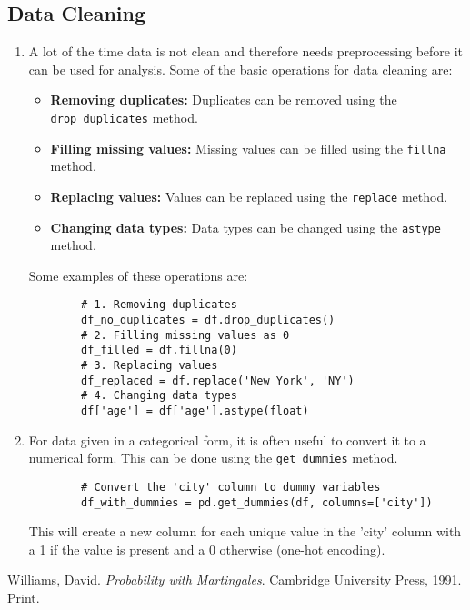 \documentclass[letterpaper, 11pt]{article}
\newcommand{\1}{\mathds{1}}	%
\theoremstyle{definition}
\begin{document}
\subsection{Data Cleaning}
\begin{enumerate}
    \item A lot of the time data is not clean and therefore needs preprocessing before it can be used for analysis. Some of the basic 
    operations for data cleaning are:
    \begin{itemize}
        \item \textbf{Removing duplicates:} Duplicates can be removed using the \texttt{drop\_duplicates} method.
        \item \textbf{Filling missing values:} Missing values can be filled using the \texttt{fillna} method.
        \item \textbf{Replacing values:} Values can be replaced using the \texttt{replace} method.
        \item \textbf{Changing data types:} Data types can be changed using the \texttt{astype} method.
    \end{itemize}
    Some examples of these operations are:
    \begin{verbatim}
        # 1. Removing duplicates
        df_no_duplicates = df.drop_duplicates()
        # 2. Filling missing values as 0
        df_filled = df.fillna(0)
        # 3. Replacing values
        df_replaced = df.replace('New York', 'NY')
        # 4. Changing data types
        df['age'] = df['age'].astype(float)
    \end{verbatim}
    \item For data given in a categorical form, it is often useful to convert it to a numerical form. This can be done using the \texttt{get\_dummies} method.
    \begin{verbatim}
        # Convert the 'city' column to dummy variables
        df_with_dummies = pd.get_dummies(df, columns=['city'])
    \end{verbatim}
    This will create a new column for each unique value in the 'city' column with a 1 if the value is present and a 0 otherwise (one-hot encoding).
    
\end{enumerate}


\begin{thebibliography}{1}

   Williams, David.
   \textit{Probability with Martingales}.
   Cambridge University Press, 1991.
   Print.


\end{thebibliography}

\end{document}
